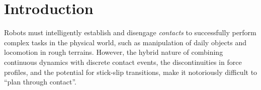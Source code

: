 
\section{Introduction}
\label{sec:introduction}

Robots must intelligently establish and disengage \emph{contacts} to successfully perform complex tasks in the physical world, such as manipulation of daily objects and locomotion in rough terrains.
However, the hybrid nature of combining continuous dynamics with discrete contact events, the discontinuities in force profiles, and the potential for stick-slip transitions, make it notoriously difficult to ``plan through contact''.

